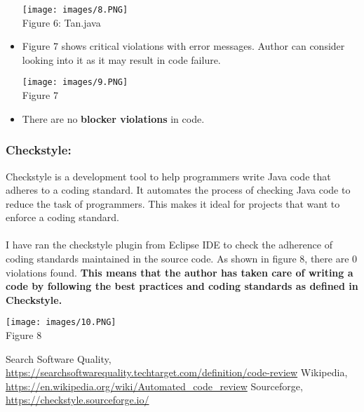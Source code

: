 \documentclass[10pt,letterpaper]{article}
\begin{document}
\begin{itemize}
    \begin{center}
    \texttt{[image: images/8.PNG]}\\
  \caption{Figure 6: Tan.java}
\end{center}
\item Figure 7 shows critical violations with error messages. Author can consider looking into it as it may result in code failure.
    \begin{center}
    \texttt{[image: images/9.PNG]}\\
  \caption{Figure 7}
\end{center}
\item There are no \textbf{blocker violations} in code.
\end{itemize}
\subsubsection{Checkstyle:}
Checkstyle is a development tool to help programmers write Java code that adheres to a coding standard. It automates the process of checking Java code to reduce the task of programmers. This makes it ideal for projects that want to enforce a coding standard. \cite{Sourceforge}
\\\\
I have ran the checkstyle plugin from Eclipse IDE to check the adherence of coding standards maintained in the source code. As shown in figure 8, there are 0 violations found. \textbf{This means that the author has taken care of writing a code by following the best practices and coding standards as defined in Checkstyle.}  
\begin{center}
    \texttt{[image: images/10.PNG]}\\
  \caption{Figure 8}
\end{center}

\begin{thebibliography}{9}
Search Software Quality,\\
\url{https://searchsoftwarequality.techtarget.com/definition/code-review}
Wikipedia,\\
\url{https://en.wikipedia.org/wiki/Automated_code_review}
Sourceforge,\\
\url{https://checkstyle.sourceforge.io/}
\end{thebibliography}
\end{document}
